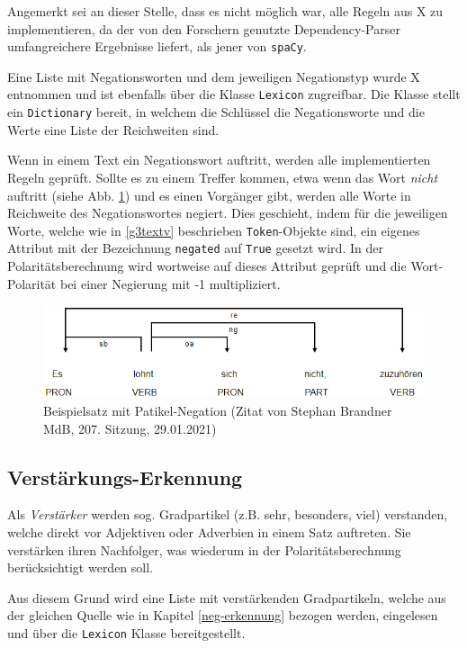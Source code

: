 Angemerkt sei an dieser Stelle, dass es nicht möglich war, alle Regeln aus X zu implementieren, da der von den Forschern genutzte Dependency-Parser umfangreichere Ergebnisse liefert, als jener von \texttt{spaCy}. 

Eine Liste mit Negationsworten und dem jeweiligen Negationstyp wurde X entnommen und ist ebenfalls über die Klasse \texttt{Lexicon} zugreifbar. 
Die Klasse stellt ein \texttt{Dictionary} bereit, in welchem die Schlüssel die Negationsworte und die Werte eine Liste der Reichweiten sind. 

Wenn in einem Text ein Negationswort auftritt, werden alle implementierten Regeln geprüft. 
Sollte es zu einem Treffer kommen, etwa wenn das Wort \textit{nicht} auftritt (siehe Abb. \ref{brandner}) und es einen Vorgänger gibt, werden alle Worte in Reichweite des Negationswortes negiert. 
Dies geschieht, indem für die jeweiligen Worte, welche wie in \ref{g3textv} beschrieben \texttt{Token}-Objekte sind, ein eigenes Attribut mit der Bezeichnung \texttt{negated} auf \texttt{True} gesetzt wird. 
In der Polaritätsberechnung wird wortweise auf dieses Attribut geprüft und die Wort-Polarität bei einer Negierung mit -1 multipliziert. 

\begin{figure}[htb]
\centerline{\includegraphics[width=1\textwidth]{brandner.png}}
\caption{Beispielsatz mit Patikel-Negation (Zitat von Stephan Brandner MdB, 207. Sitzung, 29.01.2021)}
\label{brandner}
\end{figure}

\subsection{Verstärkungs-Erkennung}
\label{ver-erkennung}
Als \textit{Verstärker} werden sog. Gradpartikel (z.B. sehr, besonders, viel) verstanden, welche direkt vor Adjektiven oder Adverbien in einem Satz auftreten. 
Sie verstärken ihren Nachfolger, was wiederum in der Polaritätsberechnung berücksichtigt werden soll. 

Aus diesem Grund wird eine Liste mit verstärkenden Gradpartikeln, welche aus der gleichen Quelle wie in Kapitel \ref{neg-erkennung} bezogen werden, eingelesen und über die \texttt{Lexicon} Klasse bereitgestellt. 

